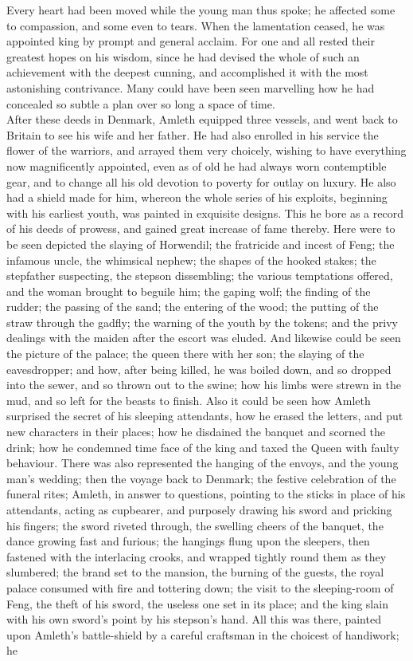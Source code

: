 \documentclass[10pt,a4paper]{report}
\begin{document}
Every heart had been moved while the young man thus spoke; he affected some to compassion, and some even to tears. When the lamentation ceased, he was appointed king by prompt and general acclaim. For one and all rested their greatest hopes on his wisdom, since he had devised the whole of such an achievement with the deepest cunning, and accomplished it with the most astonishing contrivance. Many could have been seen marvelling how he had concealed so subtle a plan over so long a space of time.\\

After these deeds in Denmark, Amleth equipped three vessels, and went back to Britain to see his wife and her father. He had also enrolled in his service the flower of the warriors, and arrayed them very choicely, wishing to have everything now magnificently appointed, even as of old he had always worn contemptible gear, and to change all his old devotion to poverty for outlay on luxury. He also had a shield made for him, whereon the whole series of his exploits, beginning with his earliest youth, was painted in exquisite designs. This he bore as a record of his deeds of prowess, and gained great increase of fame thereby. Here were to be seen depicted the slaying of Horwendil; the fratricide and incest of Feng; the infamous uncle, the whimsical nephew; the shapes of the hooked stakes; the stepfather suspecting, the stepson dissembling; the various temptations offered, and the woman brought to beguile him; the gaping wolf; the finding of the rudder; the passing of the sand; the entering of the wood; the putting of the straw through the gadfly; the warning of the youth by the tokens; and the privy dealings with the maiden after the escort was eluded. And likewise could be seen the picture of the palace; the queen there with her son; the slaying of the eavesdropper; and how, after being killed, he was boiled down, and so dropped into the sewer, and so thrown out to the swine; how his limbs were strewn in the mud, and so left for the beasts to finish. Also it could be seen how Amleth surprised the secret of his sleeping attendants, how he erased the letters, and put new characters in their places; how he disdained the banquet and scorned the drink; how he condemned time face of the king and taxed the Queen with faulty behaviour. There was also represented the hanging of the envoys, and the young man's wedding; then the voyage back to Denmark; the festive celebration of the funeral rites; Amleth, in answer to questions, pointing to the sticks in place of his attendants, acting as cupbearer, and purposely drawing his sword and pricking his fingers; the sword riveted through, the swelling cheers of the banquet, the dance growing fast and furious; the hangings flung upon the sleepers, then fastened with the interlacing crooks, and wrapped tightly round them as they slumbered; the brand set to the mansion, the burning of the guests, the royal palace consumed with fire and tottering down; the visit to the sleeping-room of Feng, the theft of his sword, the useless one set in its place; and the king slain with his own sword's point by his stepson's hand. All this was there, painted upon Amleth's battle-shield by a careful craftsman in the choicest of handiwork; he 
\end{document}
